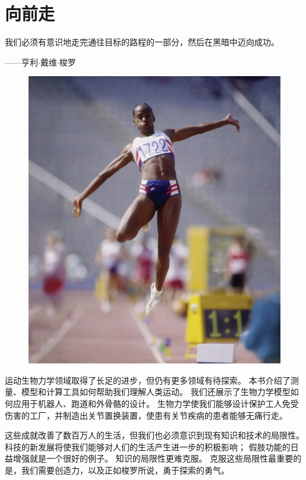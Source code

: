 \chapter{向前走} \label{chap:chap13}


我们必须有意识地走完通往目标的路程的一部分，然后在黑暗中迈向成功。
\begin{flushright}
	——亨利$\cdot$戴维$\cdot$梭罗
\end{flushright}


\begin{figure}[!htb]
	\centering
	\includegraphics[width=1.0\linewidth]{chap13/13_0}
	\caption*{ \label{fig:13_0}}
\end{figure}

运动生物力学领域取得了长足的进步，但仍有更多领域有待探索。
本书介绍了测量、模型和计算工具如何帮助我们理解人类运动。
我们还展示了生物力学模型如何应用于机器人、跑道和外骨骼的设计。
生物力学使我们能够设计保护工人免受伤害的工厂，并制造出关节置换装置，使患有关节疾病的患者能够无痛行走。


这些成就改善了数百万人的生活，但我们也必须意识到现有知识和技术的局限性。
科技的新发展将使我们能够对人们的生活产生进一步的积极影响；
假肢功能的日益增强就是一个很好的例子。
知识的局限性更难克服。
克服这些局限性最重要的是，我们需要创造力，以及正如梭罗所说，勇于探索的勇气。


